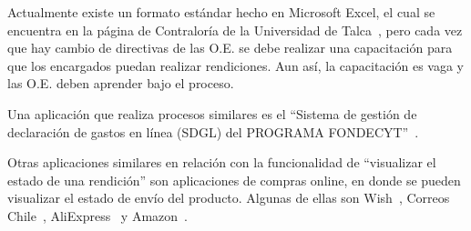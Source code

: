 Actualmente existe un formato estándar hecho en Microsoft Excel, el cual se encuentra en la página de Contraloría de la Universidad de Talca~\cite{6}, pero cada vez que hay cambio de directivas de las O.E. se debe realizar una capacitación para que los encargados puedan realizar rendiciones. Aun así, la capacitación es vaga y las O.E. deben aprender bajo el proceso.

Una aplicación que realiza procesos similares es el ``Sistema de gestión de declaración de gastos en línea (SDGL) del PROGRAMA FONDECYT''~\cite{9}.

Otras aplicaciones similares en relación con la funcionalidad de ``visualizar el estado de una rendición'' son aplicaciones de compras online, en donde se pueden visualizar el estado de envío del producto. Algunas de ellas son Wish~\cite{10}, Correos Chile~\cite{11}, AliExpress~\cite{12} y  Amazon~\cite{13}.
